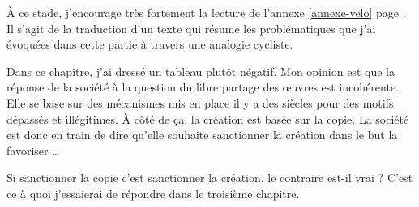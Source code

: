 À ce stade, j'encourage très fortement la lecture de l'annexe \ref*{annexe-velo} page \pageref{annexe-velo}.
Il s'agit de la traduction d'un texte qui résume les problématiques que j'ai évoquées dans cette partie à travers une analogie cycliste.

\vspace{50pt}

Dans ce chapitre, j'ai dressé un tableau plutôt négatif.
Mon opinion est que la réponse de la société à la question du libre partage des œuvres est incohérente.
Elle se base sur des mécanismes mis en place il y a des siècles pour des motifs dépassés et illégitimes.
À côté de ça, la création est basée sur la copie.
La société est donc en train de dire qu'elle souhaite sanctionner la création dans le but la favoriser \dots{}

Si sanctionner la copie c'est sanctionner la création, le contraire est-il vrai ?
C'est ce à quoi j'essaierai de répondre dans le troisième chapitre.
